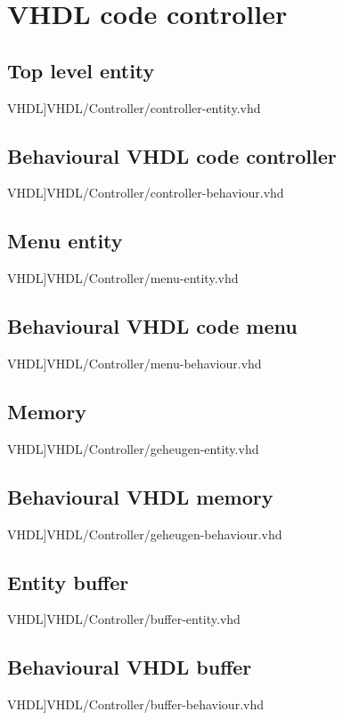 \section{VHDL code controller}
\label{Ap:code_controller}
\subsection{Top level entity}
\scriptsize 
 VHDL]{VHDL/Controller/controller-entity.vhd}
\normalsize
\label{code:controller_ent}
\subsection{Behavioural VHDL code controller}
\scriptsize 
 VHDL]{VHDL/Controller/controller-behaviour.vhd}
\normalsize
\label{code:controller_beh}
\subsection{Menu entity}
\scriptsize 
 VHDL]{VHDL/Controller/menu-entity.vhd}
\normalsize
\label{code:menu_ent}
\subsection{Behavioural VHDL code menu}
\scriptsize 
 VHDL]{VHDL/Controller/menu-behaviour.vhd}
\normalsize
\label{code:menu_beh}
\subsection{Memory}
\scriptsize 
 VHDL]{VHDL/Controller/geheugen-entity.vhd}
\normalsize
\label{code:geheugen_ent}
\subsection{Behavioural VHDL memory}
\scriptsize 
 VHDL]{VHDL/Controller/geheugen-behaviour.vhd}
\normalsize
\label{code:geheugen_beh}
\subsection{Entity buffer}
\scriptsize 
 VHDL]{VHDL/Controller/buffer-entity.vhd}
\normalsize
\label{code:buffer_ent}
\subsection{Behavioural VHDL buffer}
\scriptsize 
 VHDL]{VHDL/Controller/buffer-behaviour.vhd}
\normalsize
\label{code:buffer_beh}
